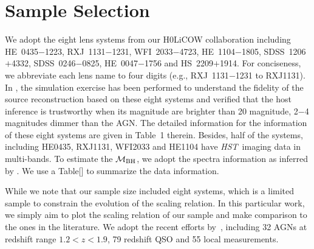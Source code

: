 \documentclass[fleqn,usenatbib]{mnras}
\newcommand{\hst}{{\it HST}}
\newcommand{\mbh}{$\mathcal M_{\rm BH}$}
\begin{document}
\section{Sample Selection}
We adopt the eight lens systems from our H0LiCOW collaboration including HE~0435$-$1223, RXJ~1131$-$1231, WFI~2033$-$4723, HE~1104$-$1805, SDSS~1206$+$4332, SDSS~0246$-$0825, HE~0047$-$1756 and HS~2209$+$1914. For conciseness, we abbreviate each lens name to four digits (e.g., RXJ~1131$-$1231 to RXJ1131). In \citet{Ding2017a}, the simulation exercise has been performed to understand the fidelity of the source reconstruction based on these eight systems and verified that the host inference is trustworthy when its magnitude are brighter than 20 magnitude, 2$-$4 magnitudes dimmer than the AGN. The detailed information for the information of these eight systems are given in Table~1 therein. Besides, half of the systems, including HE0435, RXJ1131, WFI2033 and HE1104 have \hst\ imaging data in multi-bands. To estimate the \mbh, we adopt the spectra information as inferred by \citet{Sluse2012, Peng2006, Shen2011}. We use a Table[] to summarize the data information. 

While we note that our sample size included eight systems, which is a limited sample to constrain the evolution of the scaling relation. In this particular work, we simply aim to plot the scaling relation of our sample and make comparison to the ones in the literature. %
We adopt the recent efforts by~\citet{Ding2020}, including 32 AGNs at redshift range $1.2<z<1.9$, 79 redshift QSO and 55 local measurements.
\end{document}
